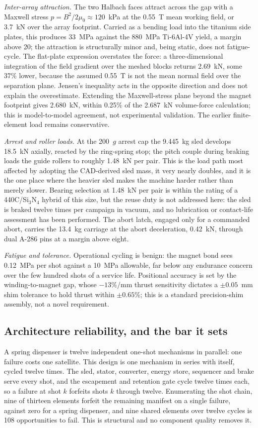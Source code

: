 \documentclass[conference]{IEEEtran}
\begin{document}
\emph{Inter-array attraction.} The two Halbach faces attract across the gap with a Maxwell stress $p=B^2/2\mu_0\approx120$~kPa at the 0.55~T mean working field, or 3.7~kN over the array footprint. Carried as a bending load into the titanium side plates, this produces 33~MPa against the 880~MPa Ti-6Al-4V yield, a margin above 20; the attraction is structurally minor and, being static, does not fatigue-cycle. The flat-plate expression overstates the force: a three-dimensional integration of the field gradient over the meshed blocks returns 2.69~kN, some 37\% lower, because the assumed 0.55~T is not the mean normal field over the separation plane. Jensen's inequality acts in the opposite direction and does not explain the overestimate. Extending the Maxwell-stress plane beyond the magnet footprint gives 2.680~kN, within 0.25\% of the 2.687~kN volume-force calculation; this is model-to-model agreement, not experimental validation. The earlier finite-element load remains conservative.

\emph{Arrest and roller loads.} At the 200~$g$ arrest cap the 9.445~kg sled develops 18.5~kN axially, reacted by the ring-spring stop; the pitch couple during braking loads the guide rollers to roughly 1.48~kN per pair. This is the load path most affected by adopting the CAD-derived sled mass, it very nearly doubles, and it is the one place where the heavier sled makes the machine harder rather than merely slower. Bearing selection at 1.48~kN per pair is within the rating of a 440C/Si$_3$N$_4$ hybrid of this size, but the reuse duty is not addressed here: the sled is braked twelve times per campaign in vacuum, and no lubrication or contact-life assessment has been performed. The abort latch, engaged only for a commanded abort, carries the 13.4~kg carriage at the abort deceleration, 0.42~kN, through dual A-286 pins at a margin above eight.

\emph{Fatigue and tolerance.} Operational cycling is benign: the magnet bond sees 0.12~MPa per shot against a 10~MPa allowable, far below any endurance concern over the few hundred shots of a service life. Positional accuracy is set by the winding-to-magnet gap, whose $-13\%$/mm thrust sensitivity dictates a $\pm0.05$~mm shim tolerance to hold thrust within $\pm0.65\%$; this is a standard precision-shim assembly, not a novel requirement.

\subsection{Architecture reliability, and the bar it sets}
A spring dispenser is twelve independent one-shot mechanisms in parallel: one failure costs one satellite. This design is one mechanism in series with itself, cycled twelve times. The sled, stator, converter, energy store, sequencer and brake serve every shot, and the escapement and retention gate cycle twelve times each, so a failure at shot $k$ forfeits shots $k$ through twelve. Enumerating the shot chain, nine of thirteen elements forfeit the remaining manifest on a single failure, against zero for a spring dispenser, and nine shared elements over twelve cycles is 108 opportunities to fail. This is structural and no component quality removes it.
\end{document}
